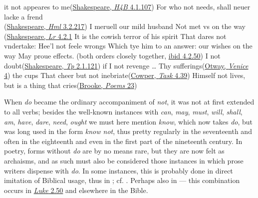\ea \label{ex:01-23}
\ea
it not appeares to me\hfill(\href{https://internetshakespeare.uvic.ca/doc/2H4_F1/scene/4.1/index.html#tln-1970}{Shakespeare, \textit{H4B} 4.1.107})
\ex
For who not needs, shall neuer lacke a frend\\\hfill(\href{https://internetshakespeare.uvic.ca/doc/Ham_F1/scene/3.2/index.html#tln-2075}{Shakespeare, \textit{Hml} 3.2.217})
\ex
I meruell our mild husband Not met vs on the way\\\hfill(\href{https://internetshakespeare.uvic.ca/doc/Lr_F1/scene/4.2/}{Shakespeare, \textit{Lr} 4.2.1}
\ex
It is the cowish terror of his spirit That dares not vndertake: Hee'l not feele wrongs Which tye him to an answer: our wishes on the way May proue effects. \hfill (both orders closely together, \href{https://internetshakespeare.uvic.ca/doc/Lr_F1/scene/4.2/index.html#tln-2280}{ibid 4.2.50}) %
\ex
I not doubt\hfill(\href{https://internetshakespeare.uvic.ca/doc/Tmp_F1/scene/2.1/index.html#tln-790}{Shakespeare, \textit{Tp} 2.1.121})
\ex
if I not revenge {\dots} Thy sufferings\hfill(\href{https://archive.org/details/venicepreservdor00otwa/page/42/mode/2up?q=%22if+I+not+revenge%22&view=theater}{Otway, \textit{Venice} 4}) %
\ex
the cups That cheer but not inebriate\hfill(\href{https://archive.org/details/in.ernet.dli.2015.186503/page/n29/mode/2up?q=%22cheer%22&view=theater}{Cowper, \textit{Task} 4.39})
\ex
Himself not lives, but is a thing that cries\hfill(\href{https://archive.org/details/poemsbyrupert00broorich/page/22/mode/2up?q=%22Himself+not+lives%2C+but+is+a+thing+that+cries%22}{Brooke, \textit{Poems} 23})
\z
\z

When \textit{do} became the ordinary accompaniment of \textit{not}, it was not at first extended to all verbs; besides the well-known instances with \textit{can}, \textit{may}, \textit{must}, \textit{will}, \textit{shall}, \textit{am}, \textit{have}, \textit{dare}, \textit{need}, \textit{ought} we must here mention \textit{know}, which now takes \textit{do}, but was long used in the form \textit{know not}, thus pretty regularly in the seventeenth and often in the eighteenth and even in the first part of the nineteenth century. In poetry, forms without \textit{do} are by no means rare, but they are now felt as archaisms, and as such must also be considered those instances in which prose writers dispense with \textit{do}. In some instances, this is probably done in direct imitation of Biblical usage, thus in ; cf. . Perhaps also in  --- this combination occurs in \href{https://archive.org/details/authorizedversio05wrig/page/130/mode/2up?q=%22and+they+vnderstood+not%22&view=theater}{\textit{Luke} 2.50} and elsewhere in the Bible.

